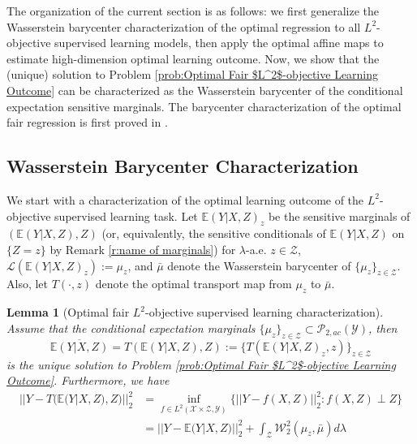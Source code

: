 \documentclass[twoside,11pt]{article}
\newtheorem{lem}{Lemma}[section]{\bfseries}{\itshape}
\begin{document}
The organization of the current section is as follows: we first generalize the Wasserstein barycenter characterization of the optimal regression to all $L^2$-objective supervised learning models, then apply the optimal affine maps to estimate high-dimension optimal learning outcome. Now, we show that the (unique) solution to Problem \ref{prob:Optimal Fair $L^2$-objective Learning Outcome} can be characterized as the Wasserstein barycenter of the conditional expectation sensitive marginals. The barycenter characterization of the optimal fair regression is first proved in \cite{chzhen2020fair, gouic2020projection}.

\subsection{Wasserstein Barycenter Characterization} \label{s:post bary}

We start with a characterization of the optimal learning outcome of the $L^2$-objective supervised learning task.  Let $\mathbb{E}(Y|X,Z)_z$ be the sensitive marginals of $(\mathbb{E}(Y|X,Z),Z)$ (or, equivalently, the sensitive conditionals of $\mathbb{E}(Y|X,Z)$ on $\{Z = z\}$ by Remark \ref{r:name of marginals}) for $\lambda$-a.e. $z \in \mathcal{Z}$, $\mathcal{L}(\mathbb{E}(Y|X,Z)_z) := \mu_z$, and $\bar{\mu}$ denote the Wasserstein barycenter of $\{\mu_z\}_{z \in \mathcal{Z}}$. Also, let $T(\cdot,z)$ denote the optimal transport map from $\mu_z$ to $\bar{\mu}$.

\begin{lem}[Optimal fair $L^2$-objective supervised learning characterization]\label{l:Optimal Fair $L^2$-Objective Supervised Learning Characterization}
Assume that the conditional expectation marginals $\{\mu_z\}_{z \in \mathcal{Z}} \subset \mathcal{P}_{2,ac}(\mathcal{Y})$, then
\begin{equation}
\overline{\mathbb{E}(Y|X,Z)} = T(\mathbb{E}(Y|X,Z),Z)  := \{T(\mathbb{E}(Y|X,Z)_z,z)\}_{z \in \mathcal{Z}} 
\end{equation}
is the unique solution to Problem \ref{prob:Optimal Fair $L^2$-objective Learning Outcome}. Furthermore, we have
\begin{align*}
||Y - T(\mathbb{E}(Y|X,Z),Z)||_2^2 & =  \inf_{f \in L^2(\mathcal{X} \times \mathcal{Z},\mathcal{Y})} \{||Y - f(X,Z)||_2^2 : f(X,Z) \perp Z\}\\
& = ||Y - \mathbb{E}(Y|X,Z)||_2^2 + \int_{\mathcal{Z}} \mathcal{W}_2^2(\mu_z, \bar{\mu}) d\lambda
\end{align*}
\end{lem}
\end{document}
